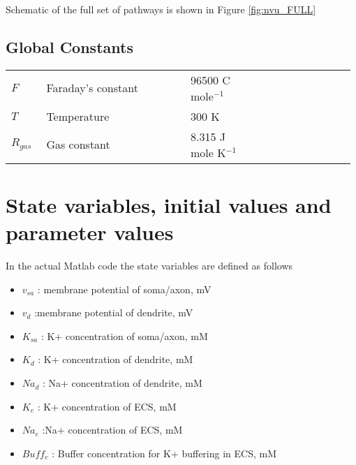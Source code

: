 \documentclass[fleqn]{report}
\numberwithin{equation}{section}
\numberwithin{equation}{section}
\newcommand{\Na}{\text{Na$^{+}$}}
\newcommand{\Glu}{\text{Glu}}
\newcommand{\K}{\text{K$^+$}}
\newcommand{\Ca}{\text{Ca$^{2+}$}}
\begin{document}
 
  Schematic of the full set of pathways is shown in Figure \ref{fig:nvu_FULL}


\section{\textbf{Global Constants}}\label{sec:equations}
	\begin{table}[h!]
		\centering
			\begin{tabular}{ p{0.1\linewidth}  >{\footnotesize} p{0.41\linewidth}  >{\footnotesize} p{0.20\linewidth} >{\footnotesize} p{0.27\linewidth} }
			\hline
			$ F $				& Faraday's constant 	& 96500 C mole$^{-1}$ & 	\\
			$ T $				& Temperature				& 300 K				 		&	\\
			$ R_{gas} $	  & Gas constant				& 8.315 J mole K$^{-1}$ &  	\\

			\hline
		\end{tabular}
	\end{table}
	


				\chapter{State variables, initial values and parameter values}
				In the actual Matlab code the state variables are defined as follows 
				            
				            \begin{itemize}
				            \item $v_{sa}$      : membrane potential of soma/axon, mV
   				            \item $v_d$        :membrane potential of dendrite, mV
		                    \item  $K_{sa}$      : K+ concentration of soma/axon, mM
		                    \item $K_d$ :  K+ concentration of dendrite, mM
                            \item $Na_d$ :  Na+ concentration of dendrite, mM
                            \item $K_e$ : K+ concentration of ECS, mM
		                    \item $Na_e$ :Na+ concentration of ECS, mM
		                    \item $Buff_e$ : Buffer concentration for K+ buffering in ECS, mM
				            \end{itemize}
				            
\end{document}
